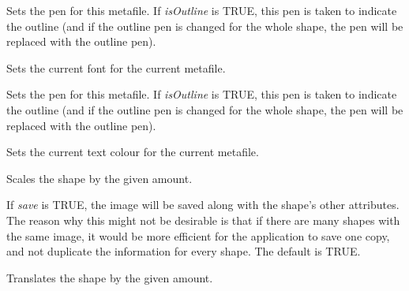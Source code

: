 Sets the pen for this metafile. If {\it isOutline} is TRUE, this pen is taken to indicate the outline
(and if the outline pen is changed for the whole shape, the pen will be replaced with the outline pen).

\label{wxdrawnshapesetdrawnfont}


Sets the current font for the current metafile.

\label{wxdrawnshapesetdrawnpen}


Sets the pen for this metafile. If {\it isOutline} is TRUE, this pen is taken to indicate the outline
(and if the outline pen is changed for the whole shape, the pen will be replaced with the outline pen).

\label{wxdrawnshapesetdrawntextcolour}


Sets the current text colour for the current metafile.



Scales the shape by the given amount.



If {\it save} is TRUE, the image will be saved along with the shape's other attributes. The reason
why this might not be desirable is that if there are many shapes with the same image, it would be
more efficient for the application to save one copy, and not duplicate the information for every
shape. The default is TRUE.



Translates the shape by the given amount.

\section{}\label{wxcircleshape}


